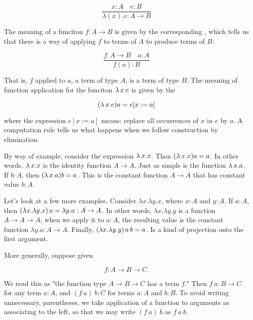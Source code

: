 \begin{equation}
\frac{x : A \quad e: B}{\lambda (x).e : A \to B}
\end{equation}

The meaning of a funciton $f : A \to B$ is given by the corresponding ,  which tells us that there is a way of applying $f$ to terms of $A$ to produce terms of $B$:

\begin{equation}
\frac{f: A \to B\quad a : A}{f(a):B}
\end{equation}

That is, $f$ applied to $a$, a term of type $A$, is a term of type $B$.  The meaning of function application for the funciton $\lambda\thinspace x.e$ is given by the 

\begin{equation}
(\lambda\thinspace x.e) a = e[x := a]
\end{equation}

where the expression $e[x := a]$ means: replace all occurrences of $x$ in $e$ by $a$.  A computation rule tells us what happens when we follow construction by elimination.

By way of example, consider the expression $\lambda\thinspace x.x$. Then $(\lambda\thinspace x.x)a = a$.  In other words, $\lambda\thinspace x.x$ is the identity function $A \to A$.  Just as simple is the function $\lambda\thinspace x.a$.  If $b: A$, then $(\lambda\thinspace x.a)b = a$.  This is the constant function $A \to A$ that has constant value $b: A$.

Let's look at a few more examples. Consider $\lambda x.\lambda y.x$, where $x: A$ and $y: A$.  If $a : A$, then $(\lambda x.\lambda y.x)\thinspace a= \lambda y.a: A \to A$.  In other words,
$\lambda x.\lambda y.y$ is a function $A \to A \to A$; when we apply it to $a : A$, the resulting value is the constant function $\lambda y.a : A \to A$.  Finally, $(\lambda x.\lambda y.y)\thinspace a\thinspace b = a$. Is a kind of projection onto the first argument.

 More generally, suppose given

$$
f : A \to B \to C.
$$

We read this as "the function type $A \to B \to C$ has a term $f$."  Then $f\ a : B \to C$ for any term $a : A$, and $(f\ a)\ b : C$ for terms $a: A$ and $b: B$.  To avoid writing unnecessary, parentheses, we take application of a function to arguments as associating to the left, so that we may write $(f\ a)\ b$  as $f\ a\ b$.


